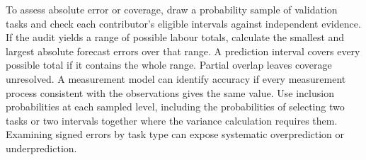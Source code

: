 To assess absolute error or coverage, draw a probability sample of validation tasks and check each contributor's eligible intervals against independent evidence. If the audit yields a range of possible labour totals, calculate the smallest and largest absolute forecast errors over that range. A prediction interval covers every possible total if it contains the whole range. Partial overlap leaves coverage unresolved. A measurement model can identify accuracy if every measurement process consistent with the observations gives the same value. Use inclusion probabilities at each sampled level, including the probabilities of selecting two tasks or two intervals together where the variance calculation requires them. Examining signed errors by task type can expose systematic overprediction or underprediction.
